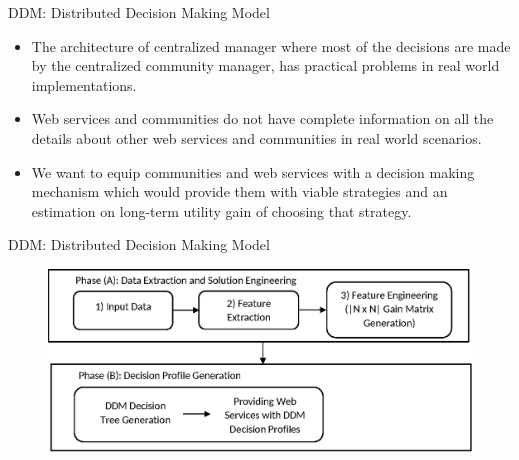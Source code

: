 \documentclass{beamer}
\begin{document}
\begin{frame}{DDM: Distributed Decision Making Model}
    \begin{itemize}
        \item The architecture of centralized manager where most of the decisions are made by the centralized community manager, has practical problems in real world implementations.
        \item Web services and communities do not have complete information on all the details about other web services and communities in real world scenarios.
        \item We want to equip communities and web services with a decision making mechanism which would provide them with viable strategies and an estimation on long-term utility gain of choosing that strategy.
    \end{itemize}
\end{frame}
\begin{frame}{DDM: Distributed Decision Making Model}
    \begin{figure}[htbp]
        \centering
        \includegraphics[width=0.9 \columnwidth]{figures/steps.eps}
    \end{figure}
\end{frame}
\end{document}
